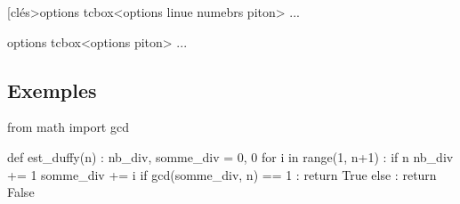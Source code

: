 \documentclass[french,a4paper,10pt]{article}
\begin{document}
{\small \begin{codehigh}
\begin{PitonThonnyEditor}[clés>{options tcbox}<options linue numebrs piton>
...
\end{PitonThonnyEditor}
\end{codehigh}}
%
%
%
%	
%	
%
{\small \begin{codehigh}
\begin{PitonThonnyConsole}[clés]{options tcbox}<options piton>
...
\end{PitonThonnyConsole}
\end{codehigh}}
%
%
%
%
\subsection{Exemples}

{\small\begin{codehigh}
\begin{python}
from math import gcd

def est_duffy(n) :
    nb_div, somme_div = 0, 0
    for i in range(1, n+1) :
        if n %
            nb_div += 1
            somme_div += i
    if gcd(somme_div, n) == 1 :
        return True
    else :
        return False

\end{python}
\end{codehigh}}
\end{document}
